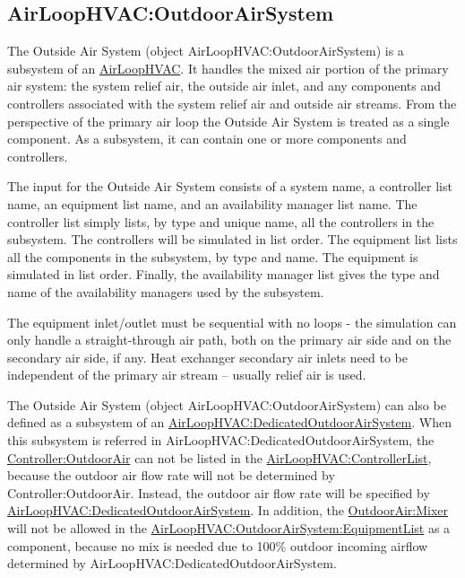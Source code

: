 \subsection{AirLoopHVAC:OutdoorAirSystem}\label{airloophvacoutdoorairsystem}

The Outside Air System (object AirLoopHVAC:OutdoorAirSystem) is a subsystem of an \hyperref[airloophvac]{AirLoopHVAC}. It handles the mixed air portion of the primary air system: the system relief air, the outside air inlet, and any components and controllers associated with the system relief air and outside air streams. From the perspective of the primary air loop the Outside Air System is treated as a single component. As a subsystem, it can contain one or more components and controllers.

The input for the Outside Air System consists of a system name, a controller list name, an equipment list name, and an availability manager list name. The controller list simply lists, by type and unique name, all the controllers in the subsystem. The controllers will be simulated in list order. The equipment list lists all the components in the subsystem, by type and name. The equipment is simulated in list order. Finally, the availability manager list gives the type and name of the availability managers used by the subsystem.

The equipment inlet/outlet must be sequential with no loops - the simulation can only handle a straight-through air path, both on the primary air side and on the secondary air side, if any. Heat exchanger secondary air inlets need to be independent of the primary air stream -- usually relief air is used.

The Outside Air System (object AirLoopHVAC:OutdoorAirSystem) can also be defined as a subsystem of an \hyperref[airloophvacdedicatedoutdoorairsystem]{AirLoopHVAC:DedicatedOutdoorAirSystem}. When this subsystem is referred in AirLoopHVAC:DedicatedOutdoorAirSystem, the \hyperref[controlleroutdoorair]{Controller:OutdoorAir} can not be listed in the \hyperref[airloophvaccontrollerlist]{AirLoopHVAC:ControllerList}, because the outdoor air flow rate will not be determined by Controller:OutdoorAir. Instead, the outdoor air flow rate will be specified by \hyperref[airloophvacdedicatedoutdoorairsystem]{AirLoopHVAC:DedicatedOutdoorAirSystem}.  In addition, the \hyperref[outdoorairmixer]{OutdoorAir:Mixer} will not be allowed in the \hyperref[airloophvacoutdoorairsystemequipmentlist]{AirLoopHVAC:OutdoorAirSystem:EquipmentList} as a component, because no mix is needed due to 100\% outdoor incoming airflow determined by AirLoopHVAC:DedicatedOutdoorAirSystem.

